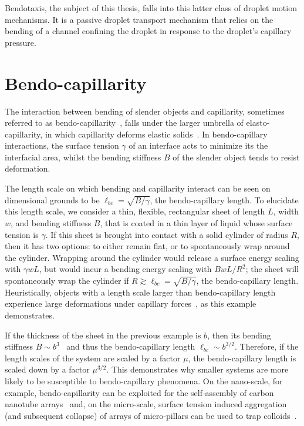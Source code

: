 Bendotaxis, the subject of this thesis, falls into this latter class of droplet motion mechanisms. It is a passive droplet transport mechanism that relies on the bending of a channel confining the droplet in response to the droplet's capillary pressure.

\section{Bendo-capillarity}
The interaction between bending of slender objects and capillarity, sometimes referred to as bendo-capillarity~\citep{Style2017AnnRevCondMatPhs}, falls under the larger umbrella of elasto-capillarity, in which capillarity deforms elastic solids~\citep{Bico2018AnnRevFluidMech}. In bendo-capillary interactions, the surface tension $\gamma$ of an interface acts to minimize its the interfacial area, whilst the bending stiffness $B$ of the slender object tends to resist deformation.

The length scale on which bending and capillarity interact can be seen on dimensional grounds to be $\ell_{bc} = \sqrt{B/\gamma}$, the bendo-capillary length. To elucidate this length scale, we consider a thin, flexible, rectangular sheet of length $L$, width $w$, and bending stiffness $B$, that is coated in a thin layer of liquid whose surface tension is $\gamma$. If this sheet is brought into contact with a solid cylinder of radius $R$, then it has two options: to either remain flat, or to spontaneously wrap around the cylinder. Wrapping around the cylinder would release a surface energy scaling with $\gamma wL$, but would incur a bending energy scaling with $BwL/R^2$; the sheet will spontaneously wrap the cylinder if $R \gtrsim \ell_{bc} = \sqrt{B/\gamma}$, the bendo-capillary length. Heuristically, objects with a length scale larger than bendo-capillary length experience large deformations under capillary forces~\citep{Roman2010JPhysCond}, as this example demonstrates.

If the thickness of the sheet in the previous example is $b$, then its bending stiffness $B \sim b^3$~\citep{Timoshenko1959} and thus the bendo-capillary length $\ell_{bc} \sim b^{3/2}$. Therefore, if the length scales of the system are scaled by a factor $\mu$, the bendo-capillary length is scaled down by a factor $\mu^{3/2}$. This demonstrates why smaller systems are more likely to be susceptible to bendo-capillary phenomena. On the nano-scale, for example,  bendo-capillarity can be exploited for the self-assembly of carbon nanotube arrays~\citep{DeVolder2013Angewandte} and, on the micro-scale, surface tension induced aggregation (and subsequent collapse) of arrays of micro-pillars can be used to trap colloids~\citep{Pokroy2009Science}.

